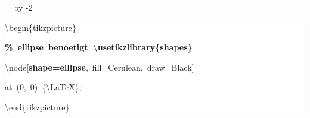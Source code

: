 \begingroup
\ttfamily
{}
=\textwidth
\advance{} by -2\fboxsep
\noindent
\colorbox{background}
{%
\parbox{\dimen255}
{%
\rule[-0.5ex]{0pt}{2.5ex}\hspace*{0.0em}\textbackslash{}begin\{tikzpicture\}\\
\rule[-0.5ex]{0pt}{2.5ex}\hspace*{1.0em}\textcolor{G}{\textbf{\%~ellipse~benoetigt~\textbackslash{}usetikzlibrary\{shapes\}}}\\
\rule[-0.5ex]{0pt}{2.5ex}\hspace*{1.0em}\textbackslash{}node[\textcolor{R}{\textbf{shape=ellipse}},~fill=Cerulean,~draw=Black]\\
\rule[-0.5ex]{0pt}{2.5ex}\hspace*{3.5em}at~(0,~0)~\{\textbackslash{}LaTeX\};\\
\rule[-0.5ex]{0pt}{2.5ex}\hspace*{0.0em}\textbackslash{}end\{tikzpicture\}}%
}%
\endgroup
